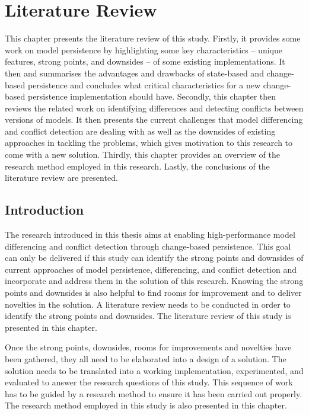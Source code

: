 \chapter{Literature Review}
\label{ch:literature_review}

This chapter presents the literature review of this study. Firstly, it provides some work on model persistence by highlighting some key characteristics -- unique features, strong points, and downsides -- of some existing implementations. It then and summarises the advantages and drawbacks of state-based and change-based persistence and concludes what critical characteristics for a new change-based persistence implementation should have. Secondly, this chapter then reviews the related work on identifying differences and detecting conflicts between versions of models. It then presents the current challenges that model differencing and conflict detection are dealing with as well as the downsides of existing approaches in tackling the problems, which gives motivation to this research to come with a new solution. Thirdly, this chapter provides an overview of the research method employed in this research. Lastly, the conclusions of the literature review are presented.  

\section{Introduction}
\label{sec:introduction_2}
The research introduced in this thesis aims at enabling high-performance model differencing and conflict detection through change-based persistence. This goal can only be delivered if this study can identify the strong points and downsides of current approaches of model persistence, differencing, and conflict detection and incorporate and address them in the solution of this research. Knowing the strong points and downsides is also helpful to find rooms for improvement and to deliver novelties in the solution. A literature review needs to be conducted in order to identify the strong points and downsides. The literature review of this study is presented in this chapter.

Once the strong points, downsides, rooms for improvements and novelties have been gathered, they all need to be elaborated into a design of a solution. The solution needs to be translated into a working implementation, experimented, and evaluated to answer the research questions of this study. This sequence of work has to be guided by a research method to ensure it has been carried out properly. The research method employed in this study is also presented in this chapter. 

